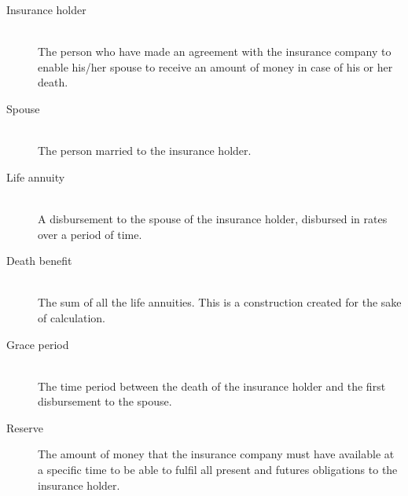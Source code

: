 \begin{description}
	\item[Insurance holder] \hfill \\
	The person who have made an agreement with the insurance company to enable his/her spouse to receive an amount of money in case of his or her death.
	\item[Spouse] \hfill \\
	The person married to the insurance holder.
	\item[Life annuity] \hfill \\
	A disbursement to the spouse of the insurance holder, disbursed in rates over a period of time.
	\item[Death benefit] \hfill \\
	The sum of all the life annuities. This is a construction created for the sake of calculation. 
	\item[Grace period] \hfill \\
	The time period between the death of the insurance holder and the first disbursement to the spouse. 
	\item[Reserve]
	The amount of money that the insurance company must have available at a specific time to be able to fulfil all present and futures obligations to the insurance holder.
\end{description}
